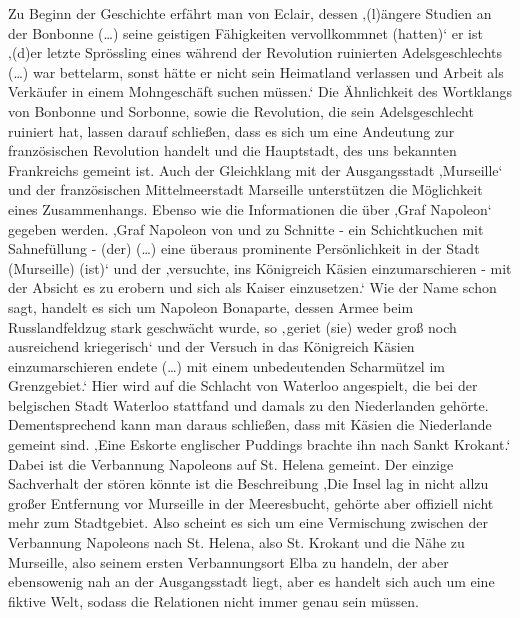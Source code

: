 {Zu Beginn der Geschichte erfährt man von Eclair, dessen ‚(l)ängere Studien an der Bonbonne (…) seine geistigen Fähigkeiten vervollkommnet (hatten)‘\cite[S.15]{pir} er ist ‚(d)er letzte Sprössling eines während der Revolution ruinierten Adelsgeschlechts (…) war bettelarm, sonst hätte er nicht sein Heimatland verlassen und Arbeit als Verkäufer in einem Mohngeschäft suchen müssen.‘\cite[S.15f]{pir} Die Ähnlichkeit des Wortklangs von Bonbonne und Sorbonne, sowie die Revolution, die sein Adelsgeschlecht ruiniert hat, lassen darauf schließen, dass es sich um eine Andeutung zur französischen Revolution handelt und die Hauptstadt, des uns bekannten Frankreichs gemeint ist. Auch der Gleichklang mit der Ausgangsstadt ‚Murseille‘\cite[S.13]{pir} und der französischen Mittelmeerstadt Marseille unterstützen die Möglichkeit eines Zusammenhangs. Ebenso wie die Informationen die über ‚Graf Napoleon‘ \cite[S.17f]{pir} gegeben werden.
‚Graf Napoleon von und zu Schnitte - ein Schichtkuchen mit Sahnefüllung - (der) (…) eine überaus prominente Persönlichkeit in der Stadt (Murseille) (ist)‘\cite[S.17]{pir} und der ‚versuchte, ins Königreich Käsien einzumarschieren - mit der Absicht es zu erobern und sich als Kaiser einzusetzen.‘\cite[S.18]{pir} Wie der Name schon sagt, handelt es sich um Napoleon Bonaparte, dessen Armee beim Russlandfeldzug stark geschwächt wurde‚ so ‚geriet (sie) weder groß noch ausreichend kriegerisch‘\cite[S.18]{pir} und der Versuch in das Königreich Käsien einzumarschieren \cite[S.18]{pir} endete (…) mit einem unbedeutenden Scharmützel im Grenzgebiet.‘ Hier wird auf die Schlacht von Waterloo angespielt, die bei der belgischen Stadt Waterloo stattfand und damals zu den Niederlanden gehörte. Dementsprechend kann man daraus schließen, dass mit Käsien die Niederlande gemeint sind. ‚Eine Eskorte englischer Puddings brachte ihn nach Sankt Krokant.‘\cite[S.18]{pir} Dabei ist die Verbannung Napoleons auf St. Helena gemeint. Der einzige Sachverhalt der stören könnte ist die Beschreibung ‚Die Insel lag in nicht allzu großer Entfernung vor Murseille in der Meeresbucht, gehörte aber offiziell nicht mehr zum Stadtgebiet. Also scheint es sich um eine Vermischung zwischen der Verbannung Napoleons nach St. Helena, also St. Krokant und die Nähe zu Murseille, also seinem ersten Verbannungsort Elba zu handeln, der aber ebensowenig nah an der Ausgangsstadt liegt, aber es handelt sich auch um eine fiktive Welt, sodass die Relationen nicht immer genau sein müssen.

}
